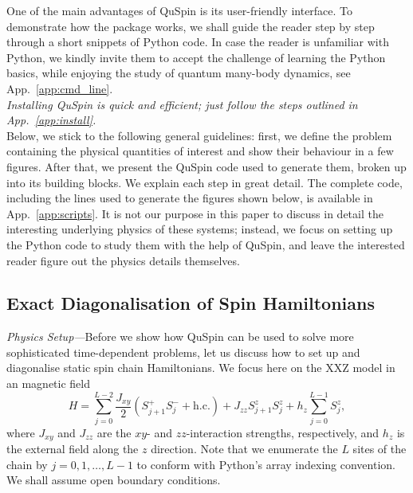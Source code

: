 \documentclass{SciPost}
\newcommand\0{\scalebox{-1}[1]{0}}
\begin{document}
One of the main advantages of QuSpin is its user-friendly interface. To demonstrate how the package works, we shall guide the reader step by step through a short snippets of Python code. In case the reader is unfamiliar with Python, we kindly invite them to accept the challenge of learning the Python basics, while enjoying the study of quantum many-body dynamics, see App.~\ref{app:cmd_line}. \\

\emph{Installing QuSpin is quick and efficient; just follow the steps outlined in App.~\ref{app:install}.}\\

\noindent Below, we stick to the following general guidelines: first, we define the problem containing the physical quantities of interest and show their behaviour in a few figures. After that, we present the QuSpin code used to generate them, broken up into its building blocks. We explain each step in great detail. The complete code, including the lines used to generate the figures shown below, is available in App.~\ref{app:scripts}. It is not our purpose in this paper to discuss in detail the interesting underlying physics of these systems; instead, we focus on setting up the Python code to study them with the help of QuSpin, and leave the interested reader figure out the physics details themselves.

\subsection{Exact Diagonalisation of Spin Hamiltonians}
\label{subsec:ED}



\emph{Physics Setup---}Before we show how QuSpin can be used to solve more sophisticated time-dependent problems, let us discuss how to set up and diagonalise static spin chain Hamiltonians. We focus here on the XXZ model in an magnetic field
\begin{equation}
H = \sum_{j=0}^{L-2}\frac{J_{xy}}{2}\left(S^+_{j+1}S^-_{j} + \mathrm{h.c.}\right) + J_{zz}S^z_{j+1}S^z_{j} + h_z\sum_{j=0}^{L-1}S^z_{j},
\label{eq:XXZ_ED}
\end{equation} 
where $J_{xy}$ and $J_{zz}$ are the $xy$- and $zz$-interaction strengths, respectively, and $h_z$ is the external field along the $z$ direction. Note that we enumerate the $L$ sites of the chain by $j = 0,1,\dots, L-1$ to conform with Python's array indexing convention. We shall assume open boundary conditions.
\end{document}
